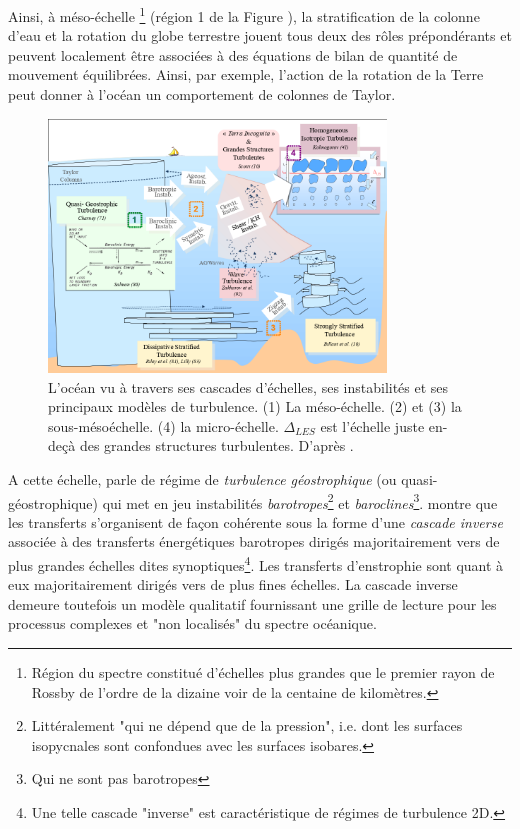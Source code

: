 Ainsi, à méso-échelle \footnote{Région du spectre constitué d'échelles plus grandes que le premier rayon de Rossby de l'ordre de la dizaine voir de la centaine de kilomètres.} (région 1 de la Figure ), la stratification de la colonne d'eau et la rotation du globe terrestre jouent tous deux des rôles prépondérants et peuvent localement être associées à des équations de bilan de quantité de mouvement équilibrées. Ainsi, par exemple, l'action de la rotation de la Terre peut donner à l'océan un comportement de colonnes de Taylor.

\begin{figure}[!h]
  \centering
  \includegraphics[width=0.8\textwidth]{./INTRO/Ocean_Scales.png}
  \caption[l'océan vu à travers ses cascades d'échelles, ses instabilités et ses principaux modèles de turbulence.]{L'océan vu à travers ses cascades d'échelles, ses instabilités et ses principaux modèles de turbulence. (1) La méso-échelle. (2) et (3) la sous-mésoéchelle. (4) la micro-échelle. $\Delta_{LES}$ est l'échelle juste en-deçà des grandes structures turbulentes. D'après \citet{charney_geostrophic_1971, salmon_baroclinic_1980,riley_direct_1981,lilly_stratified_1983,zakharov_wave_1992,billant_zigzag_2010,kolmogorov_local_1941,scotti_large_2010}.}
  \label{fig_ocean_scales}
\end{figure}

A cette échelle, \citet{charney_geostrophic_1971} parle de régime de \textit{turbulence géostrophique} (ou quasi-géostrophique) qui met en jeu instabilités \textit{barotropes}\footnote{Littéralement "qui ne dépend que de la pression", i.e. dont les surfaces isopycnales sont confondues avec les surfaces isobares.} et \textit{baroclines}\footnote{Qui ne sont pas barotropes}. \cite{salmon_baroclinic_1980} montre que les transferts s'organisent de façon cohérente sous la forme d'une \textit{cascade inverse} associée à des transferts énergétiques barotropes dirigés majoritairement vers de plus grandes échelles dites synoptiques\footnote{Une telle cascade "inverse" est caractéristique de régimes de turbulence 2D.}. Les transferts d'enstrophie sont quant à eux majoritairement dirigés vers de plus fines échelles. La cascade inverse demeure toutefois un modèle qualitatif fournissant une grille de lecture pour les processus complexes et "non localisés" du spectre océanique.

